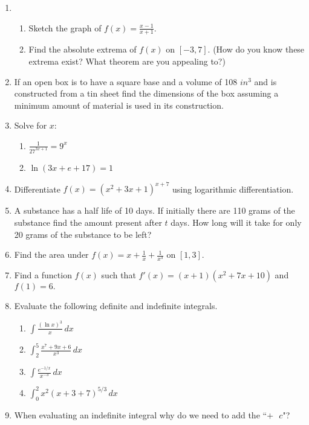 \documentclass[10pt]{article}
\newcommand{\ds}{\displaystyle}
\newcommand{\dx}{\hspace{2pt} dx}
\theoremstyle{definition}
\begin{document}
\begin{enumerate}
\item 
\begin{enumerate} 
\item Sketch the graph of $f(x) = \ds \frac{x-1}{x+1}.$
\item Find the absolute extrema of $f(x)$ on $[-3,7].$ (How do you know these extrema exist? What theorem are you appealing to?)
\end{enumerate}

\item If an open box is to have a square base and a volume of 108 $in^3$ and is constructed from a tin sheet find the dimensions of the box assuming a minimum amount of material is used in its construction.

\item Solve for $x:$
\begin{enumerate}
\item $\ds \frac{1}{27^{3x+1}} = 9^x$
\item $\ds \ln (3x+e+17)= 1$
\end{enumerate}

\item Differentiate $f(x) = (x^2 + 3x+1)^{x+7}$ using logarithmic differentiation.

\item A substance has a half life of 10 days. If initially there are 110 grams of the substance find the amount present after $t$ days. How long will it take for only 20 grams of the substance to be left?

\item Find the area under $f(x) = x + \frac{1}{x} + \frac{1}{x^3}$ on $[1,3].$

\item Find a function $f(x)$ such that $f'(x) = (x+1)(x^2+7x+10)$ and $f(1)=6.$

\item Evaluate the following definite and indefinite integrals.
\begin{enumerate}
\item $\ds \int \frac{(\ln x)^3}{x} \dx $
\item $\ds \int _2^5 \frac{x^7+9x+6}{x^3} \dx$
\item $\ds \int \frac{e^{-1/x}}{x^{-3}} \dx$
\item $\ds \int _0^2 x^2 (x+3+7)^{5/3} \dx$
\end{enumerate}

\item When evaluating an indefinite integral why do we need to add the ``$+ \text{ } c$"?

\end{enumerate}
\end{document}
